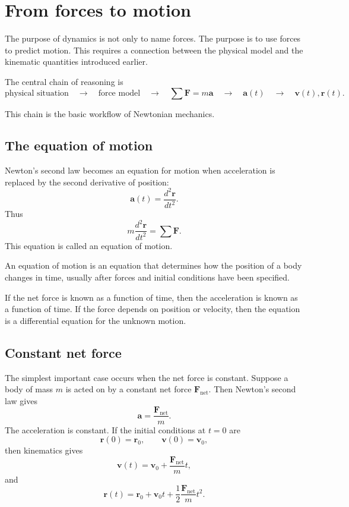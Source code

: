 \section{From forces to motion}

The purpose of dynamics is not only to name forces. The purpose is to use forces to predict motion. This requires a connection between the physical model and the kinematic quantities introduced earlier.

The central chain of reasoning is
\[
\text{physical situation}
\quad \longrightarrow \quad
\text{force model}
\quad \longrightarrow \quad
\sum \mathbf{F}=m\mathbf{a}
\quad \longrightarrow \quad
\mathbf{a}(t)
\quad \longrightarrow \quad
\mathbf{v}(t),\mathbf{r}(t).
\]

This chain is the basic workflow of Newtonian mechanics.

\subsection{The equation of motion}

Newton's second law becomes an equation for motion when acceleration is replaced by the second derivative of position:
\[
\mathbf{a}(t)=\frac{d^2\mathbf{r}}{dt^2}.
\]
Thus
\[
 m\frac{d^2\mathbf{r}}{dt^2}=\sum \mathbf{F}.
\]
This equation is called an equation of motion.

\begin{definitionbox}
An equation of motion is an equation that determines how the position of a body changes in time, usually after forces and initial conditions have been specified.
\end{definitionbox}

If the net force is known as a function of time, then the acceleration is known as a function of time. If the force depends on position or velocity, then the equation is a differential equation for the unknown motion.

\subsection{Constant net force}

The simplest important case occurs when the net force is constant. Suppose a body of mass \(m\) is acted on by a constant net force \(\mathbf{F}_{\mathrm{net}}\). Then Newton's second law gives
\[
\mathbf{a}=\frac{\mathbf{F}_{\mathrm{net}}}{m}.
\]
The acceleration is constant. If the initial conditions at \(t=0\) are
\[
\mathbf{r}(0)=\mathbf{r}_0,
\qquad
\mathbf{v}(0)=\mathbf{v}_0,
\]
then kinematics gives
\[
\mathbf{v}(t)=\mathbf{v}_0+\frac{\mathbf{F}_{\mathrm{net}}}{m}t,
\]
and
\[
\mathbf{r}(t)=\mathbf{r}_0+\mathbf{v}_0t+
\frac{1}{2}\frac{\mathbf{F}_{\mathrm{net}}}{m}t^2.
\]

